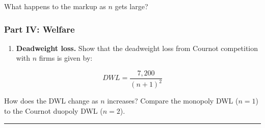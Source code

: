 \documentclass[
  11pt,
]{article}
\providecommand{\tightlist}{%
  \setlength{\itemsep}{0pt}\setlength{\parskip}{0pt}}
\begin{document}
What happens to the markup as \(n\) gets large?

\subsubsection{Part IV: Welfare}\label{part-iv-welfare}

\begin{enumerate}
\def\labelenumi{\alph{enumi})}
\setcounter{enumi}{6}
\tightlist
\item
  \textbf{Deadweight loss.} Show that the deadweight loss from Cournot
  competition with \(n\) firms is given by:
\end{enumerate}

\[DWL = \frac{7{,}200}{(n+1)^2}\]

How does the DWL change as \(n\) increases? Compare the monopoly DWL
(\(n = 1\)) to the Cournot duopoly DWL (\(n = 2\)).

\begin{center}\rule{0.5\linewidth}{0.5pt}\end{center}
\end{document}
